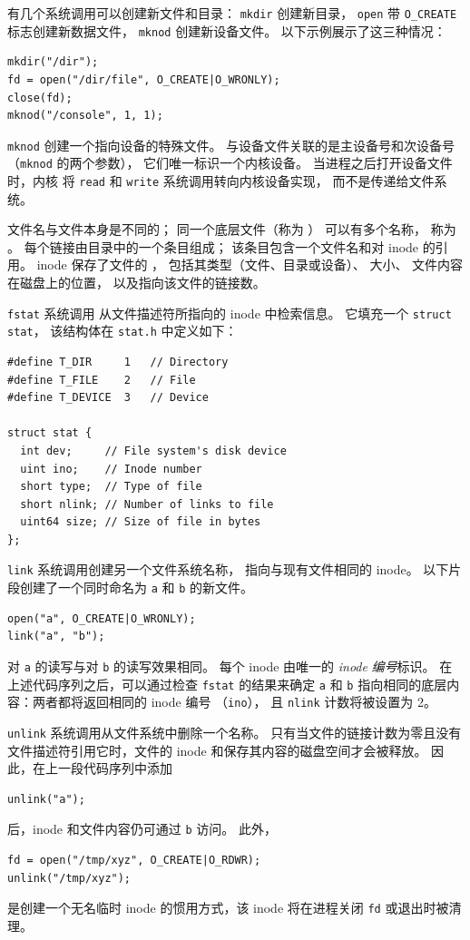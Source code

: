 有几个系统调用可以创建新文件和目录：
\lstinline{mkdir}
创建新目录，
\lstinline{open}
带
\lstinline{O_CREATE}
标志创建新数据文件，
\lstinline{mknod}
创建新设备文件。
以下示例展示了这三种情况：
\begin{lstlisting}[]
mkdir("/dir");
fd = open("/dir/file", O_CREATE|O_WRONLY);
close(fd);
mknod("/console", 1, 1);
\end{lstlisting}
\lstinline{mknod}
创建一个指向设备的特殊文件。
与设备文件关联的是主设备号和次设备号
（\lstinline{mknod} 的两个参数），
它们唯一标识一个内核设备。
当进程之后打开设备文件时，内核
将
\lstinline{read}
和
\lstinline{write}
系统调用转向内核设备实现，
而不是传递给文件系统。

文件名与文件本身是不同的；
同一个底层文件（称为
）
可以有多个名称，
称为
。
每个链接由目录中的一个条目组成；
该条目包含一个文件名和对
inode 的引用。
inode 保存了文件的
，
包括其类型（文件、目录或设备）、
大小、
文件内容在磁盘上的位置，
以及指向该文件的链接数。

\lstinline{fstat}
系统调用
从文件描述符所指向的 inode 中检索信息。
它填充一个
\lstinline{struct}
\lstinline{stat}，
该结构体在
\lstinline{stat.h} 
中定义如下：
\begin{lstlisting}[]
#define T_DIR     1   // Directory
#define T_FILE    2   // File
#define T_DEVICE  3   // Device

struct stat {
  int dev;     // File system's disk device
  uint ino;    // Inode number
  short type;  // Type of file
  short nlink; // Number of links to file
  uint64 size; // Size of file in bytes
};
\end{lstlisting}

\lstinline{link}
系统调用创建另一个文件系统名称，
指向与现有文件相同的 inode。
以下片段创建了一个同时命名为
\lstinline{a}
和
\lstinline{b} 的新文件。
\begin{lstlisting}[]
open("a", O_CREATE|O_WRONLY);
link("a", "b");
\end{lstlisting}
对
\lstinline{a}
的读写与对
\lstinline{b}
的读写效果相同。
每个 inode 由唯一的
\textit{inode}
\textit{编号}标识。
在上述代码序列之后，可以通过检查
\lstinline{fstat}
的结果来确定
\lstinline{a}
和
\lstinline{b}
指向相同的底层内容：两者都将返回相同的 inode 编号
（\lstinline{ino}），
且
\lstinline{nlink}
计数将被设置为 2。

\lstinline{unlink}
系统调用从文件系统中删除一个名称。
只有当文件的链接计数为零且没有文件描述符引用它时，文件的 inode 和保存其内容的磁盘空间才会被释放。
因此，在上一段代码序列中添加
\begin{lstlisting}[]
unlink("a");
\end{lstlisting}
后，inode 和文件内容仍可通过
\lstinline{b}
访问。
此外，
\begin{lstlisting}[]
fd = open("/tmp/xyz", O_CREATE|O_RDWR);
unlink("/tmp/xyz");
\end{lstlisting}
是创建一个无名临时 inode 的惯用方式，该 inode 将在进程关闭
\lstinline{fd}
或退出时被清理。

